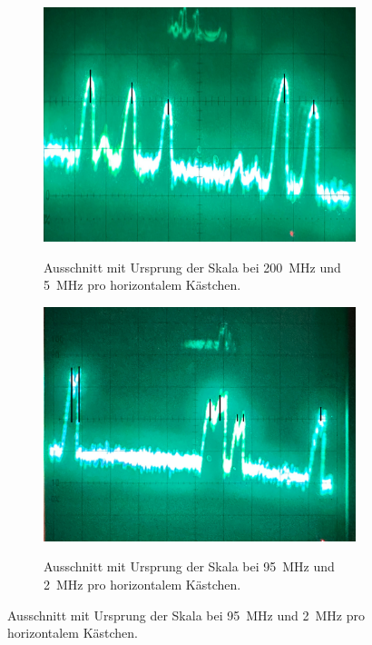 \documentclass{article}
\begin{document}
\begin{figure}[h]
  \begin{subfigure}{0.49\textwidth}
    \centering
    \includegraphics[width=\textwidth]{spectrum1}
    \label{fig:spectrum1}
    \caption{Ausschnitt mit Ursprung der Skala bei \SI{200}{\MHz} und \SI{5}{\MHz}
      pro horizontalem Kästchen.}
  \end{subfigure}
  \hfill
  \begin{subfigure}{0.49\textwidth}
    \centering
    \includegraphics[width=\textwidth]{spectrum2}
    \label{fig:spectrum2}
    \caption{Ausschnitt mit Ursprung der Skala bei \SI{95}{\MHz} und \SI{2}{\MHz}
      pro horizontalem Kästchen.}
  \end{subfigure}
  \label{fig:spectrum}
\end{figure}
\end{document}
